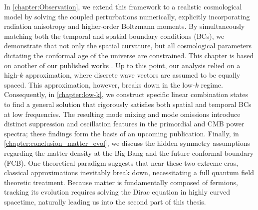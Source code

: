 \documentclass[12pt,a4paper]{report}
\let\cite\parencite
\begin{document}
In \cref{chapter:Observation}, we extend this framework to a realistic cosmological model by solving the coupled perturbations numerically, explicitly incorporating radiation anisotropy and higher-order Boltzmann moments. By simultaneously matching both the temporal and spatial boundary conditions (BCs), we demonstrate that not only the spatial curvature, but all cosmological parameters dictating the conformal age of the universe are constrained. This chapter is based on another of our published works \cite{pjz6-47jv}. Up to this point, our analysis relied on a high-$k$ approximation, where discrete wave vectors are assumed to be equally spaced. This approximation, however, breaks down in the low-$k$ regime. Consequently, in \cref{chapter:low-k}, we construct specific linear combination states to find a general solution that rigorously satisfies both spatial and temporal BCs at low frequencies. The resulting mode mixing and mode omissions introduce distinct suppression and oscillation features in the primordial and CMB power spectra; these findings form the basis of an upcoming publication. Finally, in \cref{chapter:conclusion_matter_evol}, we discuss the hidden symmetry assumptions regarding the matter density at the Big Bang and the future conformal boundary (FCB). One theoretical paradigm suggests that near these two extreme eras, classical approximations inevitably break down, necessitating a full quantum field theoretic treatment. Because matter is fundamentally composed of fermions, tracking its evolution requires solving the Dirac equation in highly curved spacetime, naturally leading us into the second part of this thesis.
\end{document}

